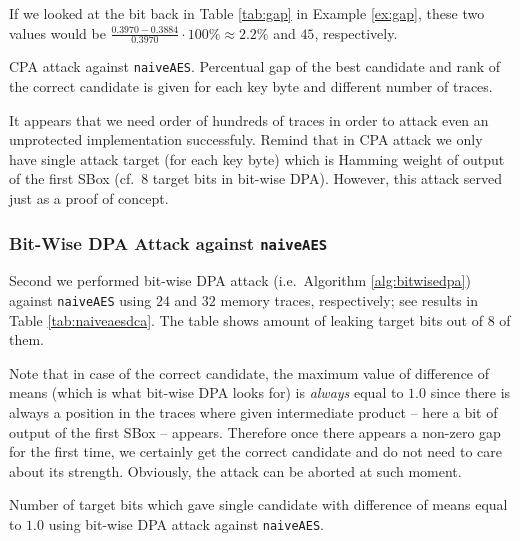 	\begin{example}
	\label{ex:gaprank}
		If we looked at the  bit back in Table \ref{tab:gap} in Example \ref{ex:gap}, these two values would be $\frac{0.3970-0.3884}{0.3970}\cdot100\%\approx2.2\%$ and $45$, respectively.
	\end{example}
	
	\begin{table}[h]
		\begin{center}
		
		\end{center}
	\caption{CPA attack against {\tt naiveAES}. Percentual gap of the best candidate and rank of the correct candidate is given for each key byte and different number of traces.}
	\label{tab:naiveaescpa}
	\end{table}
	
	It appears that we need order of hundreds of traces in order to attack even an unprotected implementation successfuly. Remind that in CPA attack we only have single attack target (for each key byte) which is Hamming weight of output of the first SBox (cf.\ $8$ target bits in bit-wise DPA). However, this attack served just as a proof of concept.

\subsubsection{Bit-Wise DPA Attack against {\tt naiveAES}}
	
	Second we performed bit-wise DPA attack (i.e.\ Algorithm \ref{alg:bitwisedpa}) against {\tt naiveAES} using $24$ and $32$ memory traces, respectively; see results in Table \ref{tab:naiveaesdca}. The table shows amount of leaking target bits out of $8$ of them.
	
	Note that in case of the correct candidate, the maximum value of difference of means (which is what bit-wise DPA looks for) is {\em always} equal to $1.0$ since there is always a position in the traces where given intermediate product -- here a bit of output of the first SBox -- appears. Therefore once there appears a non-zero gap for the first time, we certainly get the correct candidate and do not need to care about its strength. Obviously, the attack can be aborted at such moment.
	
	\begin{table}[h]
		\begin{center}
		
		\end{center}
	\caption{Number of target bits which gave single candidate with difference of means equal to $1.0$ using bit-wise DPA attack against {\tt naiveAES}.}
	\label{tab:naiveaesdca}
	\end{table}
	
